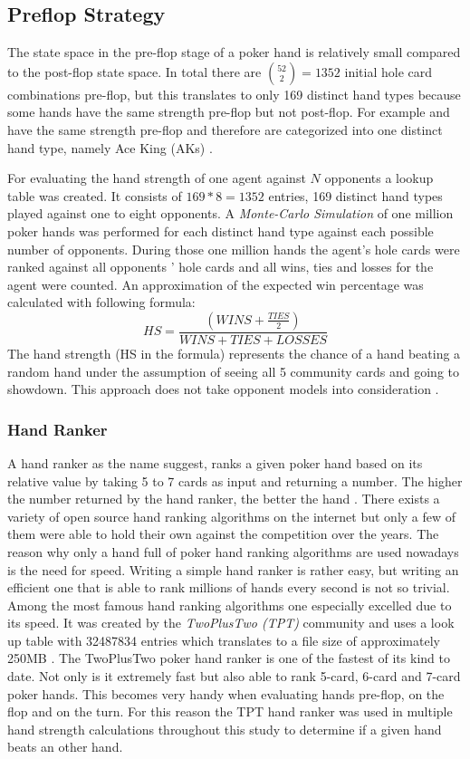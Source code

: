 \subsection{Preflop Strategy}
The state space in the pre-flop stage of a poker hand is relatively small compared to the post-flop state space. In total there are ${52\choose 2} = 1352$ initial hole card combinations pre-flop, but this translates to only 169 distinct hand types because some hands have the same strength pre-flop but not post-flop. For example \Ah\Kh and \Ad\Kd have the same strength pre-flop and therefore are categorized into one distinct hand type, namely Ace King  (AKs) \cite{opp_master}. \par
For evaluating the hand strength of one agent against $N$ opponents a lookup table was created. It consists of $169 * 8 = 1352$ entries, 169 distinct hand types played against one to eight opponents. A \textit{Monte-Carlo Simulation} of one million poker hands was performed for each distinct hand type against each possible number of opponents. During those one million hands the agent's hole cards were ranked against all opponents ' hole cards and all wins, ties and losses for the agent were counted. An approximation of the expected win percentage was calculated with following formula:
\begin{equation}
\label{eq:hs}
HS =  \frac{(WINS + \frac{TIES}{2})}{WINS + TIES + LOSSES}
\end{equation}
The hand strength (HS in the formula) represents the chance of a hand beating a random hand under the assumption of seeing all 5 community cards and going to showdown. This approach does not take opponent models into consideration \cite{opp_master}. \par
\subsubsection{Hand Ranker}
A hand ranker as the name suggest, ranks a given poker hand based on its relative value by taking 5 to 7 cards as input and returning a number. The higher the number returned by the hand ranker, the better the hand \cite{hand_eval}. There exists a variety of open source hand ranking algorithms on the internet but only a few of them were able to hold their own against the competition over the years. The reason why only a hand full of poker hand ranking algorithms are used nowadays is the need for speed. Writing a simple hand ranker is rather easy, but writing an efficient one that is able to rank millions of hands every second is not so trivial. Among the most famous hand ranking algorithms one especially excelled due to its speed. It was created by the \textit{TwoPlusTwo (TPT)} community and uses a look up table with 32487834 entries which translates to a file size of approximately 250MB \cite{hand_eval}. The TwoPlusTwo poker hand ranker is one of the fastest of its kind to date. Not only is it extremely fast but also able to rank 5-card, 6-card and 7-card poker hands. This becomes very handy when evaluating hands pre-flop, on the flop and on the turn. For this reason the TPT hand ranker was used in multiple hand strength calculations throughout this study to determine if a given hand beats an other hand. 
